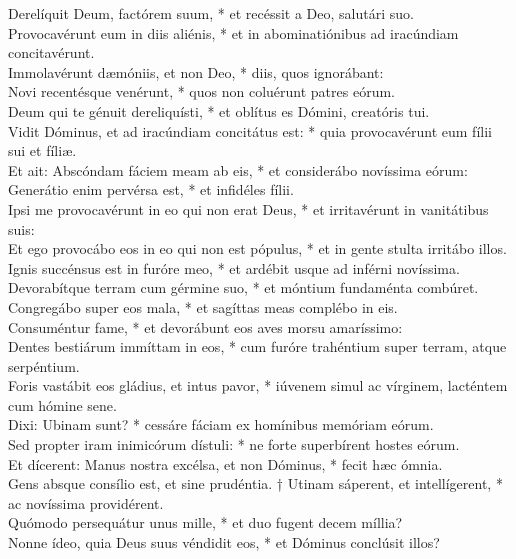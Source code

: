 {	Derelíquit Deum, factórem suum, * et recéssit a Deo, salutári suo. \\
	Provocavérunt eum in diis aliénis, * et in abominatiónibus ad iracúndiam concitavérunt. \\
	Immolavérunt dæmóniis, et non Deo, * diis, quos ignorábant: \\
	Novi recentésque venérunt, * quos non coluérunt patres eórum. \\
	Deum qui te génuit dereliquísti, * et oblítus es Dómini, creatóris tui. \\
	Vidit Dóminus, et ad iracúndiam concitátus est: * quia provocavérunt eum fílii sui et fíliæ. \\
	Et ait: Abscóndam fáciem meam ab eis, * et considerábo novíssima eórum:  \\
	Generátio enim pervérsa est, * et infidéles fílii. \\
	Ipsi me provocavérunt in eo qui non erat Deus, * et irritavérunt in vanitátibus suis:  \\
	Et ego provocábo eos in eo qui non est pópulus, * et in gente stulta irritábo illos. \\
	Ignis succénsus est in furóre meo, * et ardébit usque ad inférni novíssima. \\
	Devorabítque terram cum gérmine suo, * et móntium fundaménta combúret. \\
	Congregábo super eos mala, * et sagíttas meas complébo in eis. \\
	Consuméntur fame, * et devorábunt eos aves morsu amaríssimo:  \\
	Dentes bestiárum immíttam in eos, * cum furóre trahéntium super terram, atque serpéntium. \\
	Foris vastábit eos gládius, et intus pavor, * iúvenem simul ac vírginem, lacténtem cum hómine sene. \\
	Dixi: Ubinam sunt? * cessáre fáciam ex homínibus memóriam eórum. \\
	Sed propter iram inimicórum dístuli: * ne forte superbírent hostes eórum.  \\
	Et dícerent: Manus nostra excélsa, et non Dóminus, * fecit hæc ómnia. \\
	Gens absque consílio est, et sine prudéntia. † Utinam sáperent, et intellígerent, * ac novíssima providérent. \\
	Quómodo persequátur unus mille, * et duo fugent decem míllia?  \\
	Nonne ídeo, quia Deus suus véndidit eos, * et Dóminus conclúsit illos? \\
}
